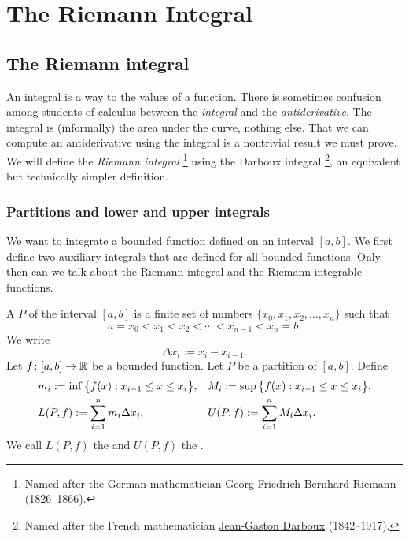 \chapter{The Riemann Integral} \label{int:chapter}


\section{The Riemann integral}
\label{sec:rint}


An integral is a way to  the values of a function.
There is sometimes confusion among students of
calculus between the \emph{integral} and the \emph{antiderivative}.
The integral is (informally) the area under the curve, nothing else.
That we can compute an antiderivative using the integral is a nontrivial
result we must prove.  
We will define the \emph{Riemann integral}%
\footnote{Named after the German mathematician
\href{https://en.wikipedia.org/wiki/Riemann}{Georg Friedrich Bernhard Riemann}
(1826--1866).}
using the Darboux integral%
\footnote{Named after the French mathematician
\href{https://en.wikipedia.org/wiki/Darboux}{Jean-Gaston Darboux} (1842--1917).},
an equivalent but technically simpler definition.

\subsection{Partitions and lower and upper integrals}

We want to integrate a bounded function defined on an interval $[a,b]$.
We first define two auxiliary integrals that are defined for all
bounded functions.  Only then can we talk about the Riemann integral and
the Riemann integrable functions.

\begin{defn}
A \emph{} $P$ of the interval $[a,b]$ is
a finite set of numbers $\{ x_0,x_1,x_2,\ldots,x_n \}$ such that
\begin{equation*}
a = x_0 < x_1 < x_2 < \cdots < x_{n-1} < x_n = b .
\end{equation*}
We write
\begin{equation*}
\Delta x_i := x_i - x_{i-1} .
\end{equation*}
Let $f \colon [a,b] \to {\mathbb{R}}$ be a bounded function.  Let $P$ be a partition of
$[a,b]$.
Define
\begin{align*}
& m_i := \inf \, \bigl\{ f(x) : x_{i-1} \leq x \leq x_i \bigr\} , &
& M_i := \sup \, \bigl\{ f(x) : x_{i-1} \leq x \leq x_i \bigr\} , \\
& L(P,f) :=
\sum_{i=1}^n m_i \Delta x_i , &
& U(P,f) :=
\sum_{i=1}^n M_i \Delta x_i .
\avoidbreak
\end{align*}
We call $L(P,f)$ the \emph{} and
$U(P,f)$ the \emph{}.
\end{defn}

